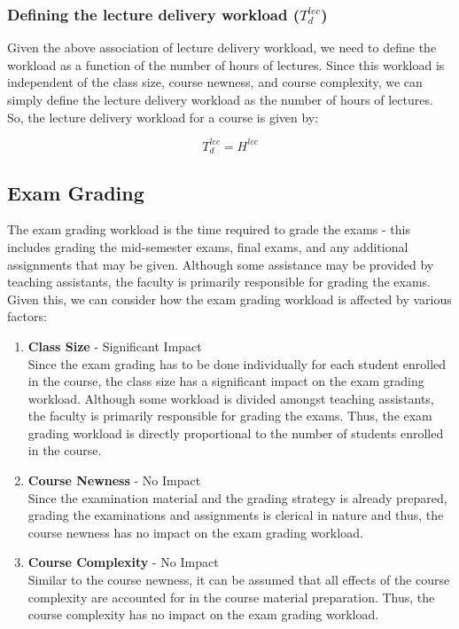 \subsubsection{Defining the lecture delivery workload (\(T_d^{lec}\))}

Given the above association of lecture delivery workload, we need to define the workload as a function of the number of hours of lectures. Since this workload is independent of the class size, course newness, and course complexity, we can simply define the lecture delivery workload as the number of hours of lectures. So, the lecture delivery workload for a course is given by:

\begin{equation}
  \label{eqn:lecture-delivery-workload}
  T_d^{lec} = H^{lec}
\end{equation}


\subsection{Exam Grading}

The exam grading workload is the time required to grade the exams - this includes grading the mid-semester exams, final exams, and any additional assignments that may be given. Although some assistance may be provided by teaching assistants, the faculty is primarily responsible for grading the exams. Given this, we can consider how the exam grading workload is affected by various factors:

\begin{enumerate}
  \item \textbf{Class Size} - Significant Impact \\
        Since the exam grading has to be done individually for each student enrolled in the course, the class size has a significant impact on the exam grading workload. Although some workload is divided amongst teaching assistants, the faculty is primarily responsible for grading the exams. Thus, the exam grading workload is directly proportional to the number of students enrolled in the course.

  \item \textbf{Course Newness} - No Impact \\
        Since the examination material and the grading strategy is already prepared, grading the examinations and assignments is clerical in nature and thus, the course newness has no impact on the exam grading workload.

  \item \textbf{Course Complexity} - No Impact \\
        Similar to the course newness, it can be assumed that all effects of the course complexity are accounted for in the course material preparation. Thus, the course complexity has no impact on the exam grading workload.

\end{enumerate}

